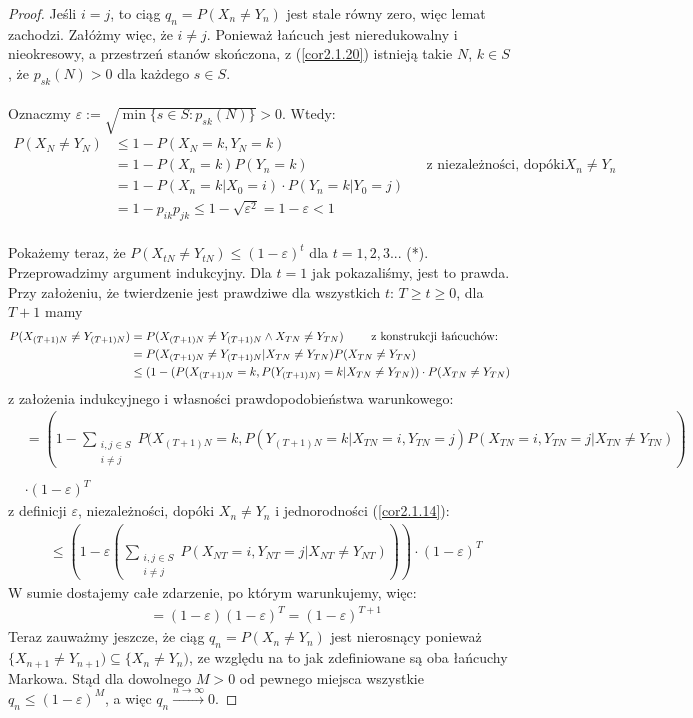 \documentclass[a4paper]{article}
\theoremstyle{defn}
\theoremstyle{theorem}
\theoremstyle{lemma}
\theoremstyle{cor}
\theoremstyle{fact}
\begin{document}
\begin{proof}
Jeśli $i = j$, to ciąg $q_n = P(X_n \neq Y_n)$ jest stale równy zero, więc lemat zachodzi. Załóżmy więc, że $i \neq j$. Ponieważ łańcuch jest nieredukowalny i nieokresowy, a przestrzeń stanów skończona, z (\ref{cor2.1.20}) istnieją takie $N$, $k \in S$, że $p_{sk}(N) > 0$ dla każdego $s \in S$.\\\\
Oznaczmy $\varepsilon := \sqrt{\min\{s \in S: p_{sk}(N)\}} > 0$. Wtedy:
\begin{align*}
P(X_N \neq Y_N) &\leq 1 - P(X_N = k, Y_N = k) \\
&= 1 - P(X_n = k)P(Y_n = k) && \text{z niezależności, dopóki $X_n \neq Y_n$} \\
&= 1 - P(X_n = k|X_0 = i) \cdot P(Y_n = k|Y_0 = j) \\
&= 1 - p_{ik}p_{jk} \leq 1 - \sqrt{\varepsilon^2} = 1 - \varepsilon < 1
\end{align*}
\\
Pokażemy teraz, że $P(X_{tN} \neq Y_{tN}) \leq (1-\varepsilon)^t$ dla $t=1,2,3...$ (*). Przeprowadzimy argument indukcyjny. Dla $t = 1$ jak pokazaliśmy, jest to prawda. Przy założeniu, że twierdzenie jest prawdziwe dla wszystkich $t$: $T \geq t \geq 0$, dla $T+1$ mamy
\begin{align*}
    P(X_{(T+1)N} \neq Y_{(T+1)N}) &= P(X_{(T+1)N} \neq Y_{(T+1)N} \land X_{TN} \neq Y_{TN})
    \text{ \quad\quad z konstrukcji łańcuchów:}\\
    &= P(X_{(T+1)N} \neq Y_{(T+1)N} | X_{TN} \neq Y_{TN})P(X_{TN} \neq Y_{TN})\\
    &\leq (1 - (P(X_{(T+1)N} = k, P(Y_{(T+1)N)} = k  |  X_{TN} \neq Y_{TN})) \cdot P(X_{TN} \neq Y_{TN})
    \end{align*}
    z założenia indukcyjnego i własności prawdopodobieństwa warunkowego:
    \begin{align*}
    & = \left(1 - \sum\limits_{\substack{i,j \in S\\i\neq j}} P(X_{(T+1)N} = k, P(Y_{(T+1)N} = k | X_{TN} = i, Y_{TN} = j)P(X_{TN} = i, Y_{TN} = j | X_{TN} \neq Y_{TN})\right)\\\\
    &\cdot (1 - \varepsilon)^T
\end{align*}
 z definicji $\varepsilon$, niezależności, dopóki $X_n \neq Y_n$ i jednorodności (\ref{cor2.1.14}):
\begin{align*}
    &\leq \left( 1 - \varepsilon \left(\sum_{\substack{i,j \in S\\i\neq j}} P(X_{NT} = i, Y_{NT} = j | X_{NT} \neq Y_{NT})\right)\right)\cdot (1- \varepsilon)^T
\end{align*}
W sumie dostajemy całe zdarzenie, po którym warunkujemy, więc:
\begin{align*}
    &= (1-\varepsilon)(1-\varepsilon)^T = (1- \varepsilon)^{T+1}
\end{align*}
Teraz zauważmy jeszcze, że ciąg $q_n = P(X_n \neq Y_n)$ jest nierosnący ponieważ $\{X_{n+1} \neq Y_{n+1}) \subseteq \{X_{n} \neq Y_{n})$, ze względu na to jak zdefiniowane są oba łańcuchy Markowa. Stąd dla dowolnego $M > 0$ od pewnego miejsca wszystkie $q_n \leq (1-\varepsilon)^M$, a więc $q_n \xrightarrow{n \to \infty} 0$.
\end{proof}
\end{document}
